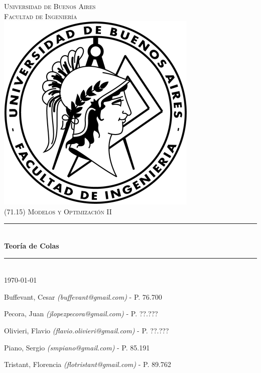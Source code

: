 \documentclass[a4paper,11pt]{article}
\begin{document}
\thispagestyle{empty}

\begin{titlepage}

\newcommand{\HRule}{\rule{\linewidth}{0.5mm}}
\newenvironment{bottompar}{\par\vspace*{\fill}}{\clearpage}

\center

\textsc{\LARGE Universidad de Buenos Aires}\\[0.5cm]
\textsc{\Large Facultad de Ingeniería}\\[1.5cm]

\includegraphics[scale=0.5]{../logo.png}\\[1cm]


\textsc{\large (71.15) Modelos y Optimización II}\\[0.25cm]
\HRule \\[0.4cm]
{\huge \bfseries Teoría de Colas}\\[0.4cm]
\HRule \\[0.5cm]

{\large \today}

\begin{bottompar}
\flushleft
Buffevant, Cesar \textit{(buffevant@gmail.com)}         - P. 76.700

Pecora, Juan \textit{(jlopezpecora@gmail.com)}          - P. ??.???

Olivieri, Flavio \textit{(flavio.olivieri@gmail.com)}   - P. ??.???

Piano, Sergio \textit{(smpiano@gmail.com)}              - P. 85.191

Tristant, Florencia \textit{(flotristant@gmail.com)}    - P. 89.762
\end{bottompar}

\end{titlepage}
\end{document}
